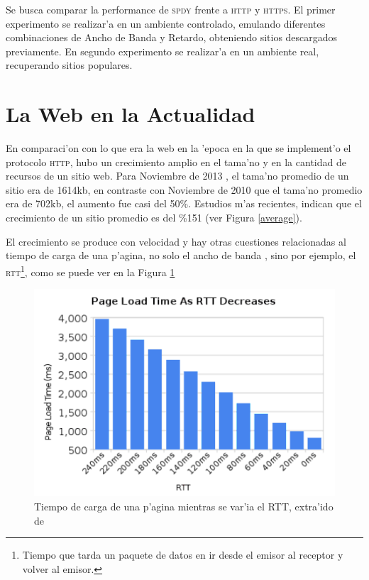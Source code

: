 \documentclass[a4paper,11pt,twocolumn]{article}
\begin{document}
Se busca comparar la performance de \textsc{spdy} frente a \textsc{http} y \textsc{https}. El primer experimento se realizar'a en un ambiente controlado, emulando diferentes combinaciones de Ancho de Banda y Retardo, obteniendo sitios descargados previamente. En segundo experimento se realizar'a en un ambiente real, recuperando sitios populares.

\section{La Web en la Actualidad}

En comparaci'on con lo que era la web en la 'epoca en la que se implement'o el protocolo \textsc{http}, hubo un crecimiento amplio en el tama'no y en la cantidad de recursos de un sitio web. Para Noviembre de 2013 \cite{httpArchive}, el tama'no promedio de un sitio era de 1614kb, en contraste con Noviembre de 2010 que el tama'no promedio era de 702kb, el aumento fue casi del 50\%. Estudios m'as recientes, indican que el crecimiento de un sitio promedio es del \%151 \cite{tammy} (ver Figura \ref{average}).

El crecimiento se produce con velocidad \cite{averageWebPage} y hay otras cuestiones relacionadas al tiempo de carga de una p'agina, no solo el ancho de banda \cite{moreBand}, sino por ejemplo, el \textsc{rtt}\footnote{Tiempo que tarda un paquete de datos en ir desde el emisor al receptor y volver al emisor.}, como se puede ver en la Figura \ref{rttBelsche}

\begin{figure}[h!]
  	\centering
	\includegraphics[scale=0.5]{belsche}
	\caption{\small Tiempo de carga de una p'agina mientras se var'ia el RTT, extra'ido de \cite{moreBand}}
	\label{rttBelsche}
\end{figure}
\end{document}
